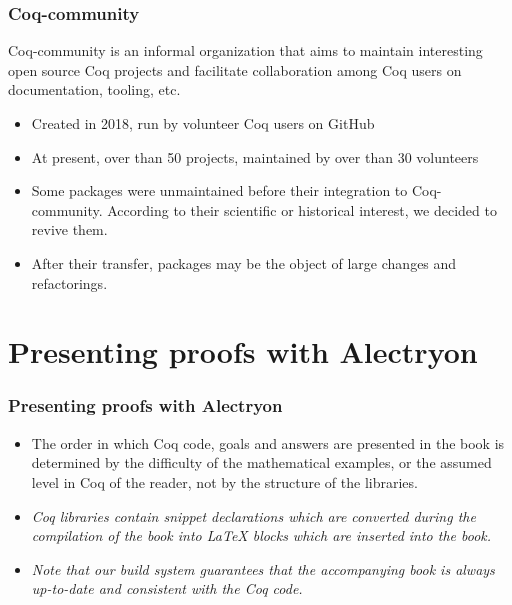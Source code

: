\documentclass[10pt]{beamer}
\newcommand{\coq}{Coq\xspace}
\newcommand{\community}{Coq-community\xspace}
\newcommand{\alectr}{Alectryon\xspace}
\begin{document}
  \begin{frame}
    \frametitle{\community}
    \begin{block}{}
      \community is an informal organization that aims to maintain interesting open source \coq projects and facilitate collaboration among Coq users on documentation, tooling, etc.
      \begin{itemize}
      \item Created in 2018,  run by volunteer Coq users on GitHub
      \item At present, over than 50 projects, maintained by over than 30 volunteers
      \item Some packages were unmaintained before their integration to \community. According to their scientific or historical interest, we decided to revive them.
        \item After their transfer, packages may be the object of large changes  and refactorings.
      \end{itemize}
    \end{block}
  \end{frame}

\section{Presenting proofs with \alectr}
\begin{frame}
  \frametitle{Presenting proofs with \alectr}
  \begin{block}{}
    \begin{itemize}
    \item The order in which \coq code, goals and answers are presented in the book is determined by the difficulty of the mathematical examples, or the assumed level in \coq of the reader, not by the structure of the libraries.
    \item
      \emph{\coq libraries contain \emph{snippet declarations} which are converted during the compilation of the book into \LaTeX\xspace blocks which are inserted into the book.}

    \item {\color{lookcolor} \emph{Note that our build system guarantees that the accompanying book is always up-to-date and consistent with the \coq code.}}
    \end{itemize}
  \end{block}
\end{frame}
\end{document}
